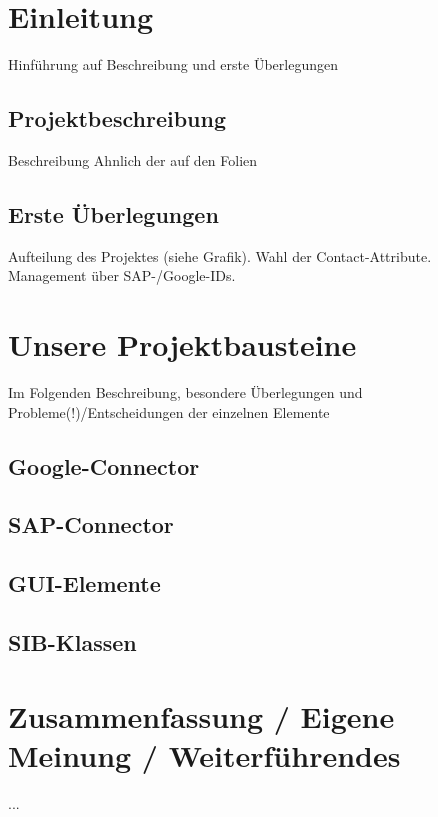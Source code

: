 \section{Einleitung}
Hinführung auf Beschreibung und erste Überlegungen

\subsection{Projektbeschreibung}
Beschreibung Ahnlich der auf den Folien

\subsection{Erste Überlegungen}
Aufteilung des Projektes (siehe Grafik). Wahl der Contact-Attribute. Management über SAP-/Google-IDs.



\section{Unsere Projektbausteine}
Im Folgenden Beschreibung, besondere Überlegungen und Probleme(!)/Entscheidungen der einzelnen Elemente

\subsection{Google-Connector}


\subsection{SAP-Connector}


\subsection{GUI-Elemente}



\subsection{SIB-Klassen}




\section{Zusammenfassung / Eigene Meinung / Weiterführendes}
...
